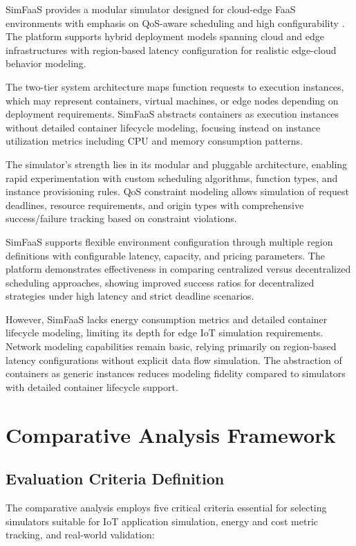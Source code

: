 SimFaaS provides a modular simulator designed for cloud-edge FaaS environments with emphasis on QoS-aware scheduling and high configurability \cite{mahmoudi2021simfaas}. The platform supports hybrid deployment models spanning cloud and edge infrastructures with region-based latency configuration for realistic edge-cloud behavior modeling.

The two-tier system architecture maps function requests to execution instances, which may represent containers, virtual machines, or edge nodes depending on deployment requirements. SimFaaS abstracts containers as execution instances without detailed container lifecycle modeling, focusing instead on instance utilization metrics including CPU and memory consumption patterns.

The simulator's strength lies in its modular and pluggable architecture, enabling rapid experimentation with custom scheduling algorithms, function types, and instance provisioning rules. QoS constraint modeling allows simulation of request deadlines, resource requirements, and origin types with comprehensive success/failure tracking based on constraint violations.

SimFaaS supports flexible environment configuration through multiple region definitions with configurable latency, capacity, and pricing parameters. The platform demonstrates effectiveness in comparing centralized versus decentralized scheduling approaches, showing improved success ratios for decentralized strategies under high latency and strict deadline scenarios.

However, SimFaaS lacks energy consumption metrics and detailed container lifecycle modeling, limiting its depth for edge IoT simulation requirements. Network modeling capabilities remain basic, relying primarily on region-based latency configurations without explicit data flow simulation. The abstraction of containers as generic instances reduces modeling fidelity compared to simulators with detailed container lifecycle support.


\section{Comparative Analysis Framework}

\subsection{Evaluation Criteria Definition}

The comparative analysis employs five critical criteria essential for selecting simulators suitable for IoT application simulation, energy and cost metric tracking, and real-world validation:

